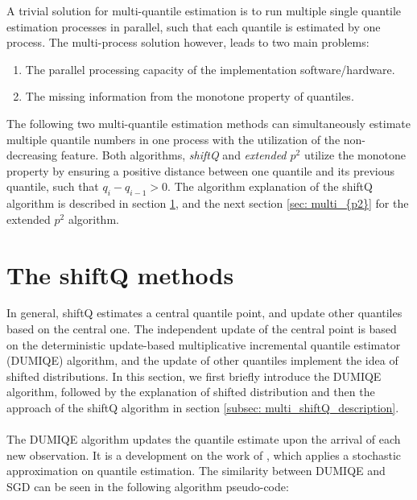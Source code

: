A trivial solution for multi-quantile estimation is to run multiple single quantile estimation processes in parallel, such that each quantile is estimated by one process. The multi-process solution however, leads to two main problems:
\begin{enumerate}
    \item The parallel processing capacity of the implementation software/hardware.
    \item The missing information from the monotone property of quantiles.
\end{enumerate}

The following two multi-quantile estimation methods can simultaneously estimate multiple quantile numbers in one process with the utilization of the non-decreasing feature. Both algorithms, \textit{shiftQ}\cite{hammerJointTrackingMultiple2019b} and \textit{extended $p^2$}\cite{raatikainenSequentialProcedureSimultaneous1993} utilize the monotone property by ensuring a positive distance between one quantile and its previous quantile, such that 
$q_{i} - q_{i-1} > 0$. The algorithm explanation of the shiftQ algorithm is described in section \ref{sec: multi_shiftQ}, and the next section \ref{sec: multi_{p2}} for the extended $p^2$ algorithm.


\section{The shiftQ methods}
\label{sec: multi_shiftQ}

In general, shiftQ estimates a central quantile point, and update other quantiles based on the central one. The independent update of the central point is based on the deterministic update-based multiplicative incremental quantile estimator (DUMIQE) algorithm\cite{yazidiMultiplicativeUpdateMethods2019}, and the update of other quantiles implement the idea of shifted distributions. In this section, we first briefly introduce the DUMIQE algorithm, followed by the explanation of shifted distribution and then the approach of the shiftQ algorithm in section \ref{subsec: multi_shiftQ_description}.
\\\\
The DUMIQE algorithm updates the quantile estimate upon the arrival of each new observation. It is a development on the work of \citeauthor{tierneySpaceEfficientRecursiveProcedure1983}\cite{tierneySpaceEfficientRecursiveProcedure1983}, which applies a stochastic approximation on quantile estimation. The similarity between DUMIQE and SGD can be seen in the following algorithm pseudo-code:


